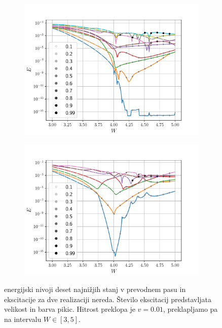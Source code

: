 \begin{figure}[!h]
\centering
\begin{subfigure}{.49\textwidth}
\includegraphics[width=\linewidth]{Figures/EksTekom1.pdf}
\end{subfigure}
\begin{subfigure}{.49\textwidth}
\includegraphics[width=\linewidth]{Figures/EksTekom2.pdf}
\end{subfigure}
\caption{energijski nivoji deset najnižjih stanj v prevodnem pasu in ekscitacije za dve realizaciji nereda. Število ekscitacij predstavljata velikost in barva pikic. Hitrost preklopa je $v=0.01$, preklapljamo pa na intervalu $W \in [3,5]$.}
\label{fig:EksTekom}
\end{figure} \newpage
